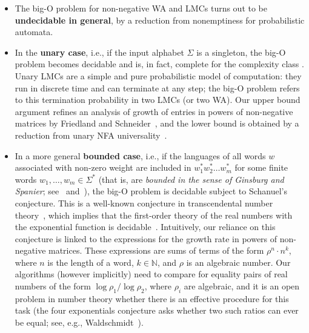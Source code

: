 \documentclass{lmcs}
\theoremstyle{plain}
\theoremstyle{definition}
\theoremstyle{remark}
\begin{document}
\begin{itemize}
\item
The big-O problem for non-negative WA and LMCs turns out to be \textbf{undecidable
in general}, by a reduction from nonemptiness for probabilistic automata.
\item
In the \textbf{unary case}, i.e.,
if the input alphabet $\Sigma$ is a singleton, the big-O problem
becomes decidable and is, in fact, complete for the complexity class \coNP.
Unary LMCs are a simple and pure probabilistic model of computation:
they run in discrete time and can terminate at any step; the big-O problem
refers to this termination probability in two LMCs (or two WA).
Our upper bound argument refines an analysis of growth of entries in
powers of non-negative matrices by Friedland and Schneider~\cite{schneider1986influence},
and
the lower bound is obtained by a reduction from unary NFA universality~\cite{stockmeyer1973word}.\item
In a more general \textbf{bounded case}, i.e.,
if the languages of all words $w$ associated with non-zero weight are included in
$w_1^* w_2^* \ldots w_m^*$ for some finite words $w_1, \ldots, w_m \in \Sigma^*$
(that is, are \emph{bounded in the sense of Ginsburg and Spanier};
 see~\cite[Chapter~5]{GinsburgMTCFL} and~\cite{ginsburg1964bounded}),
the big-O problem is decidable subject to Schanuel's conjecture.
This is a well-known conjecture in transcendental number theory~\cite{lang1966introduction}, which
implies that the first-order theory of the real numbers with the exponential
function is decidable~\cite{macintyre1996decidability}.
Intuitively,
our reliance on this conjecture is linked to
the expressions for the growth rate in powers of non-negative matrices.
These expressions are sums of terms of the form
$\rho^n \cdot n^k$, where $n$ is the length of a word, $k \in \mathbb N$,
and $\rho$ is an algebraic number.
Our algorithms (however implicitly) need to compare for equality
pairs of real numbers of the form
$\log \rho_1 / \log \rho_2$, where $\rho_i$ are algebraic,
and it is an open problem in number theory
whether there is an effective procedure for this task
(the four exponentials conjecture asks whether two such ratios
 can ever be equal; see, e.g., Waldschmidt~\cite[Sections~1.3 and~1.4]{Waldschmidt00}).


\end{itemize}
\end{document}
